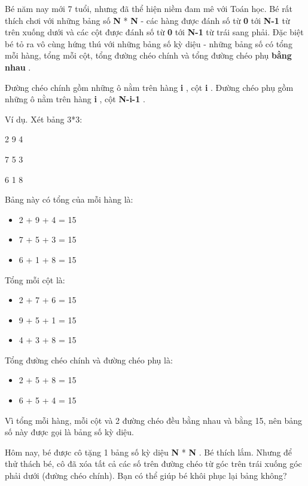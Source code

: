 Bé năm nay mới 7 tuổi, nhưng đã thể hiện niềm đam mê với Toán học. Bé rất thích chơi với những bảng số   \textbf{    N   }   *   \textbf{    N   }   - các hàng được đánh số từ   \textbf{    0   }   tới   \textbf{    N-1   }   từ trên xuống dưới và các cột được đánh số từ   \textbf{    0   }   tới   \textbf{    N-1   }   từ trái sang phải. Đặc biệt bé tỏ ra vô cùng hứng thú với những bảng số kỳ diệu - những bảng số có tổng mỗi hàng, tổng mỗi cột, tổng đường chéo chính và tổng đường chéo phụ   \textbf{    bằng nhau   }   .  

   Đường chéo chính gồm những ô nằm trên hàng   \textbf{    i   }   , cột   \textbf{    i   }   . Đường chéo phụ gồm những ô nằm trên hàng   \textbf{    i   }   , cột   \textbf{    N-i-1   }   .  

   Ví dụ. Xét bảng 3*3:  

   2 9 4  

   7 5 3  

   6 1 8  

   Bảng này có tổng của mỗi hàng là:  
\begin{itemize}
	\item     2 + 9 + 4 = 15   
	\item     7 + 5 + 3 = 15   
	\item     6 + 1 + 8 = 15   
\end{itemize}

   Tổng mỗi cột là:  
\begin{itemize}
	\item     2 + 7 + 6 = 15   
	\item     9 + 5 + 1 = 15   
	\item     4 + 3 + 8 = 15   
\end{itemize}

   Tổng đường chéo chính và đường chéo phụ là:  
\begin{itemize}
	\item     2 + 5 + 8 = 15   
	\item     6 + 5 + 4 = 15   
\end{itemize}

   Vì tổng mỗi hàng, mỗi cột và 2 đường chéo đều bằng nhau và bằng 15, nên bảng số này được gọi là bảng số kỳ diệu.  

   Hôm nay, bé được cô tặng 1 bảng số kỳ diệu   \textbf{    N   }   *   \textbf{    N   }   . Bé thích lắm. Nhưng để thử thách bé, cô đã xóa tất cả các số trên đường chéo từ góc trên trái xuống góc phải dưới (đường chéo chính). Bạn có thể giúp bé khôi phục lại bảng không?